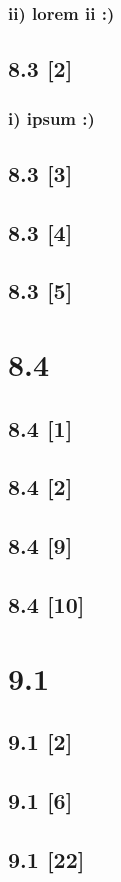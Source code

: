 \documentclass{article}
\begin{document}
\subsubsection*{ii) lorem ii :)}

\subsection*{8.3 [2]}

\subsubsection*{i) ipsum :)}

\subsection*{8.3 [3]}
\subsection*{8.3 [4]}
\subsection*{8.3 [5]}

\newpage

\section*{8.4}
\setcounter{equation}{0}

\subsection*{8.4 [1]}
\subsection*{8.4 [2]}
\subsection*{8.4 [9]}
\subsection*{8.4 [10]}

\newpage

\section*{9.1}
\setcounter{equation}{0}

\subsection*{9.1 [2]}
\subsection*{9.1 [6]}
\subsection*{9.1 [22]}
\end{document}
